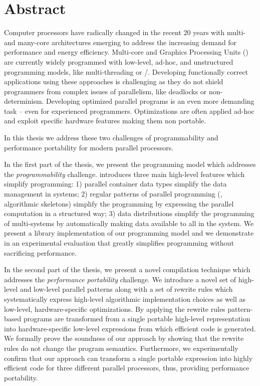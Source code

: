 \chapter*{Abstract}\label{abstract}

Computer processors have radically changed in the recent 20 years with multi- and many-core architectures emerging to address the increasing demand for performance and energy efficiency.
Multi-core \CPUs and Graphics Processing Units (\GPUs) are currently widely programmed with low-level, ad-hoc, and unstructured programming models, like multi-threading or \OpenCL /\CUDA.
Developing functionally correct applications using these approaches is challenging as they do not shield programmers from complex issues of parallelism, like deadlocks or non-determinism.
Developing optimized parallel programs is an even more demanding task -- even for experienced programmers.
Optimizations are often applied ad-hoc and exploit specific hardware features making them non portable.

In this thesis we address these two challenges of programmability and performance portability for modern parallel processors.

In the first part of the thesis, we present the \SkelCL programming model which addresses the \emph{programmability} challenge.
\SkelCL introduces three main high-level features which simplify \GPU programming:
1) parallel container data types simplify the data management in \GPU systems;
2) regular patterns of parallel programming (\aka, algorithmic skeletons) simplify the programming by expressing the parallel computation in a structured way;
3) data distributions simplify the programming of multi-\GPU systems by automatically making data available to all \GPUs in the system.
We present a \Cpp library implementation of our programming model and we demonstrate in an experimental evaluation that \SkelCL greatly simplifies \GPU programming without sacrificing performance.

In the second part of the thesis, we present a novel compilation technique which addresses the \emph{performance portability} challenge.
We introduce a novel set of high-level and low-level parallel patterns along with a set of rewrite rules which systematically express high-level algorithmic implementation choices as well as low-level, hardware-specific optimizations.
By applying the rewrite rules pattern-based programs are transformed from a single portable high-level representation into hardware-specific low-level expressions from which efficient \OpenCL code is generated.
We formally prove the soundness of our approach by showing that the rewrite rules do not change the program semantics.
Furthermore, we experimentally confirm that our approach can transform a single portable expression into highly efficient code for three different parallel processors, thus, providing performance portability.

